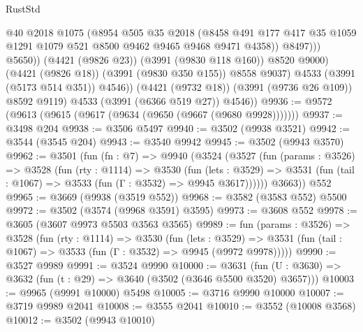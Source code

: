 \begin{lexlean}{RustStd}
\begin{coremodule}
                            @40
                            @2018
                            @1075
                            (@8954
                              @505
                              @35
                              @2018
                              (@8458
                                @491
                                @177
                                @417
                                @35
                                @1059
                                @1291
                                @1079
                                @521
                                @8500
                                @9462
                                @9465
                                @9468
                                @9471
                                @4358))
                            @8497)))
                      @5650))
                  (@4421 (@9826 @23))
                  (@3991 (@9830 @118 @160))
                  @8520
                  @9000)
                (@4421 (@9826 @18))
                (@3991 (@9830 @350 @155))
                @8558
                @9037)
              @4533
              (@3991 (@5173 @514 @351))
              @4546))
          (@4421 (@9732 @18))
          (@3991 (@9736 @26 @109))
          @8592
          @9119)
        @4533
        (@3991 (@6366 @519 @27))
        @4546))
@9936 := @9572 (@9613 (@9615 (@9617 (@9634 (@9650 (@9667 (@9680 @9928)))))))
@9937 := @3498 @204
@9938 := @3506 @5497
@9940 := @3502 (@9938 @3521)
@9942 := @3544 (@3545 @204)
@9943 := @3540 @9942
@9945 := @3502 (@9943 @3570)
@9962 := @3501
    (fun (fn : @7) =>
    @9940
      (@3524
        (@3527
          (fun (params : @3526) =>
          @3528
            (fun (rty : @1114) =>
            @3530
              (fun (lets : @3529) =>
              @3531 (fun (tail : @1067) => @3533 (fun (Γ : @3532) => @9945 @3617))))))
        @3663))
    @552
@9965 := @3669 (@9938 (@3519 @552))
@9968 := @3582 (@3583 @552) @5500
@9972 := @3502 (@3574 (@9968 @3591) @3595)
@9973 := @3608 @552
@9978 := @3605 (@3607 @9973 @5503 @3563 @3565)
@9989 := fun (params : @3526) =>
  @3528
    (fun (rty : @1114) =>
    @3530
      (fun (lets : @3529) =>
      @3531 (fun (tail : @1067) => @3533 (fun (Γ : @3532) => @9945 (@9972 @9978)))))
@9990 := @3527 @9989
@9991 := @3524 @9990
@10000 := @3631
    (fun (U : @3630) => @3632 (fun (t : @29) => @3640 (@3502 (@3646 @5500 @3520) @3657)))
@10003 := @9965 (@9991 @10000) @5498
@10005 := @3716 @9990 @10000
@10007 := @3719 @9989 @2041
@10008 := @3555 @2041
@10010 := @3552 (@10008 @3568)
@10012 := @3502 (@9943 @10010)

\end{coremodule}
\end{lexlean}
